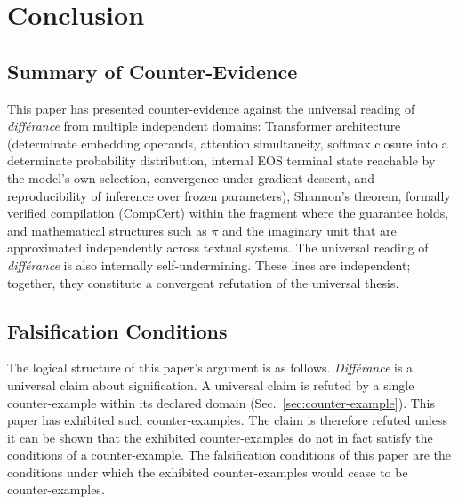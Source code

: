 \documentclass[a4paper,twocolumn,11pt]{article}
\begin{document}

\section{Conclusion}
\label{sec:conclusion}

\subsection{Summary of Counter-Evidence}

This paper has presented counter-evidence against the universal reading of \emph{diff\'erance} from multiple independent domains: Transformer architecture (determinate embedding operands, attention simultaneity, softmax closure into a determinate probability distribution, internal EOS terminal state reachable by the model's own selection, convergence under gradient descent, and reproducibility of inference over frozen parameters), Shannon's theorem, formally verified compilation (CompCert) within the fragment where the guarantee holds, and mathematical structures such as $\pi$ and the imaginary unit that are approximated independently across textual systems. The universal reading of \emph{diff\'erance} is also internally self-undermining. These lines are independent; together, they constitute a convergent refutation of the universal thesis.

\subsection{Falsification Conditions}
\label{sec:falsification}

The logical structure of this paper's argument is as follows. \emph{Diff\'erance} is a universal claim about signification. A universal claim is refuted by a single counter-example within its declared domain (Sec.~\ref{sec:counter-example}). This paper has exhibited such counter-examples. The claim is therefore refuted unless it can be shown that the exhibited counter-examples do not in fact satisfy the conditions of a counter-example. The falsification conditions of this paper are the conditions under which the exhibited counter-examples would cease to be counter-examples.
\end{document}
